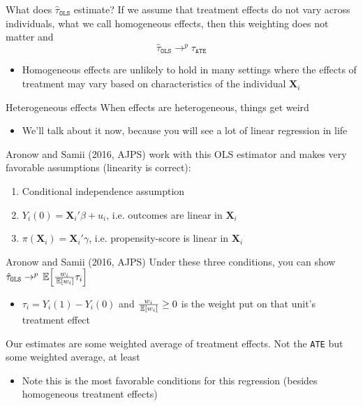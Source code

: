 \documentclass[aspectratio=169,t,11pt,table]{beamer}
\begin{document}
\begin{frame}{What does $\hat{\tau}_{\texttt{OLS}}$ estimate?}
  If we assume that treatment effects do not vary across individuals, what we call \alert{homogeneous effects}, then this weighting does not matter and 
  $$
    \hat{\tau}_{\texttt{OLS}} \to^p \tau_{\texttt{ATE}}
  $$
  \pause
  \begin{itemize}
    \item Homogeneous effects are unlikely to hold in many settings where the effects of treatment may vary based on characteristics of the individual $\bm{X}_i$  
  \end{itemize}
\end{frame}

\begin{frame}{Heterogeneous effects}
  When effects are heterogeneous, things get weird
  \begin{itemize}
    \item We'll talk about it now, because you will see a lot of linear regression in life
  \end{itemize}

  \bigskip
  \pause
  Aronow and Samii (2016, AJPS) work with this OLS estimator and makes very favorable assumptions (linearity is correct):
  \begin{enumerate}
    \item Conditional independence assumption
    
    \item $Y_i(0) = \bm{X}_i' \beta + u_i$, i.e. outcomes are linear in $\bm{X}_i$
    
    \item $\pi(\bm{X}_i) = \bm{X}_i' \gamma$, i.e. propensity-score is linear in $\bm{X}_i$
  \end{enumerate}
\end{frame}

\begin{frame}{Aronow and Samii (2016, AJPS)}
  Under these three conditions, you can show $\hat{\tau}_{\texttt{OLS}} \to^p \expec{\frac{w_i}{\expec{w_i}} \tau_i}$
  \begin{itemize}
    \item $\tau_i = Y_i(1) - Y_i(0)$ and $\frac{w_i}{\expec{w_i}} \geq 0$ is the weight put on that unit's treatment effect
  \end{itemize}

  Our estimates are some weighted average of treatment effects. Not the \texttt{ATE} but some weighted average, at least
  \begin{itemize}
    \item Note this is the most favorable conditions for this regression (besides homogeneous treatment effects)
  \end{itemize}
\end{frame}
\end{document}
